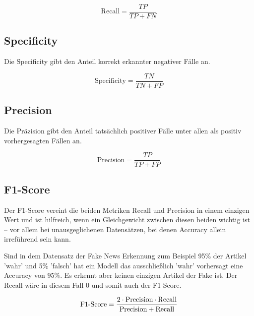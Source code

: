 \begin{equation}
    \text{Recall} = \frac{TP}{TP + FN}
\end{equation}

\subsection{Specificity}

Die Specificity gibt den Anteil korrekt erkannter negativer Fälle an.

\begin{equation}
    \text{Specificity} = \frac{TN}{TN + FP}
\end{equation}

\subsection{Precision}

Die Präzision gibt den Anteil tatsächlich positiver Fälle unter allen als positiv vorhergesagten Fällen an.

\begin{equation}
    \text{Precision} = \frac{TP}{TP + FP}
\end{equation}

\subsection{F1-Score}

Der F1-Score vereint die beiden Metriken Recall und Precision in einem einzigen Wert und ist hilfreich, wenn ein Gleichgewicht zwischen 
diesen beiden wichtig ist – vor allem bei unausgeglichenen Datensätzen, bei denen Accuracy allein irreführend sein kann.

Sind in dem Datensatz der Fake News Erkennung zum Beispiel 95\% der Artikel 'wahr' und 5\% 'falsch' hat ein Modell das ausschließlich
'wahr' vorhersagt eine Accuracy von 95\%. Es erkennt aber keinen einzigen Artikel der Fake ist.
Der Recall wäre in diesem Fall 0 und somit auch der F1-Score.

\begin{equation}
\text{F1\text{-}Score} = \frac{2 \cdot \text{Precision} \cdot \text{Recall}}{\text{Precision} + \text{Recall}}
\end{equation}

